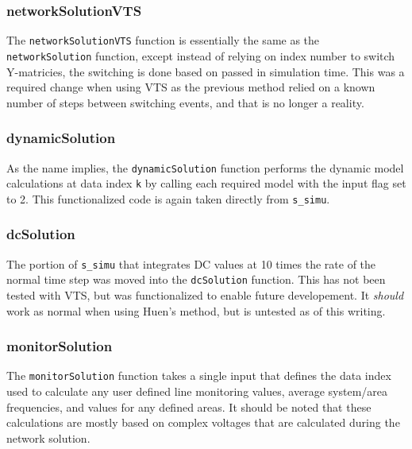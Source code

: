 \subsubsection{networkSolutionVTS}  
The \verb|networkSolutionVTS| function is essentially the same as the \verb|networkSolution| function, except instead of relying on index number to switch Y-matricies, the switching is done based on passed in simulation time.
This was a required change when using VTS as the previous method relied on a known number of steps between switching events, and that is no longer a reality.


\subsubsection{dynamicSolution}  
As the name implies, the \verb|dynamicSolution| function performs the dynamic model calculations at data index \verb|k| by calling each required model with the input flag set to 2.
This functionalized code is again taken directly from \verb|s_simu|.


\subsubsection{dcSolution}  
The portion of \verb|s_simu| that integrates DC values at 10 times the rate of the normal time step was moved into the \verb|dcSolution| function.
This has not been tested with VTS, but was functionalized to enable future developement.
It \emph{should} work as normal when using Huen's method, but is untested as of this writing.

\subsubsection{monitorSolution}  
The \verb|monitorSolution| function takes a single input that defines the data index used to calculate any user defined line monitoring values, average system/area frequencies, and values for any defined areas.
It should be noted that these calculations are mostly based on complex voltages that are calculated during the network solution.


